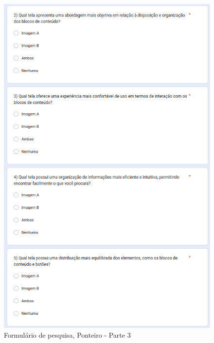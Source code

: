 \begin{figure}[!h]
	\begin{center}
	    \includegraphics[scale=0.6]{figs/Form/21.png}
	\end{center}
	\caption{\label{AP_PonP03}Formulário de pesquisa, Ponteiro - Parte 3}
\end{figure}

\newpage

